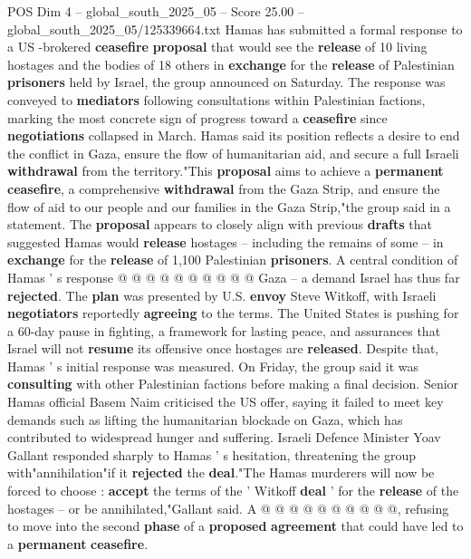 \begin{textsample}{POS Dim 4 – global\_south\_2025\_05 – Score 25.00 – global\_south\_2025\_05/125339664.txt}  \label{ex:f4_pos_093}
Hamas has submitted a formal response to a US -brokered \textbf{ceasefire} \textbf{proposal} that would see the \textbf{release} of 10 living hostages and the bodies of 18 others in \textbf{exchange} for the \textbf{release} of Palestinian \textbf{prisoners} held by Israel, the group announced on Saturday.
The response was conveyed to \textbf{mediators} following consultations within Palestinian factions, marking the most concrete sign of progress toward a \textbf{ceasefire} since \textbf{negotiations} collapsed in March.
Hamas said its position reflects a desire to end the conflict in Gaza, ensure the flow of humanitarian aid, and secure a full Israeli \textbf{withdrawal} from the territory."This \textbf{proposal} aims to achieve a \textbf{permanent} \textbf{ceasefire}, a comprehensive \textbf{withdrawal} from the Gaza Strip, and ensure the flow of aid to our people and our families in the Gaza Strip,"the group said in a statement.
The \textbf{proposal} appears to closely align with previous \textbf{drafts} that suggested Hamas would \textbf{release} hostages -- including the remains of some -- in \textbf{exchange} for the \textbf{release} of 1,100 Palestinian \textbf{prisoners}.
A central condition of Hamas ' s response @ @ @ @ @ @ @ @ @ @ Gaza -- a demand Israel has thus far \textbf{rejected}.
The \textbf{plan} was presented by U.S. \textbf{envoy} Steve Witkoff, with Israeli \textbf{negotiators} reportedly \textbf{agreeing} to the terms.
The United States is pushing for a 60-day pause in fighting, a framework for lasting peace, and assurances that Israel will not \textbf{resume} its offensive once hostages are \textbf{released}.
Despite that, Hamas ' s initial response was measured.
On Friday, the group said it was \textbf{consulting} with other Palestinian factions before making a final decision.
Senior Hamas official Basem Naim criticised the US offer, saying it failed to meet key demands such as lifting the humanitarian blockade on Gaza, which has contributed to widespread hunger and suffering.
Israeli Defence Minister Yoav Gallant responded sharply to Hamas ' s hesitation, threatening the group with"annihilation"if it \textbf{rejected} the \textbf{deal}."The Hamas murderers will now be forced to choose : \textbf{accept} the terms of the ' Witkoff \textbf{deal} ' for the \textbf{release} of the hostages -- or be annihilated,"Gallant said.
A @ @ @ @ @ @ @ @ @ @, refusing to move into the second \textbf{phase} of a \textbf{proposed} \textbf{agreement} that could have led to a \textbf{permanent} \textbf{ceasefire}.

\end{textsample}
